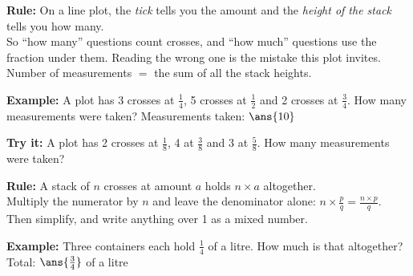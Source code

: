 \documentclass[12pt]{article}
\begin{document}


\begin{formulabox}
\textbf{Rule:} On a line plot, the \emph{tick} tells you the amount and the \emph{height of the stack} tells you how many.\\[3pt]
So ``how many'' questions count crosses, and ``how much'' questions use the fraction under them. Reading the wrong one is the mistake this plot invites.\\[3pt]
Number of measurements $=$ the sum of all the stack heights.
\end{formulabox}

\begin{examplebox}
\textbf{Example:} \quad A plot has 3 crosses at $\frac{1}{4}$, 5 crosses at $\frac{1}{2}$ and 2 crosses at $\frac{3}{4}$. How many measurements were taken?
Measurements taken: $\ans{10}$
\end{examplebox}

\begin{tryitbox}
\textbf{Try it:} \quad A plot has 2 crosses at $\frac{1}{8}$, 4 at $\frac{3}{8}$ and 3 at $\frac{5}{8}$. How many measurements were taken?\\[2pt]
\end{tryitbox}


\begin{formulabox}
\textbf{Rule:} A stack of $n$ crosses at amount $a$ holds $n \times a$ altogether.\\[3pt]
Multiply the numerator by $n$ and leave the denominator alone: $n \times \frac{p}{q} = \frac{n \times p}{q}$. Then simplify, and write anything over 1 as a mixed number.
\end{formulabox}

\begin{examplebox}
\textbf{Example:} \quad Three containers each hold $\frac{1}{4}$ of a litre. How much is that altogether?
Total: $\ans{\tfrac{3}{4}}$ of a litre
\end{examplebox}
\end{document}
